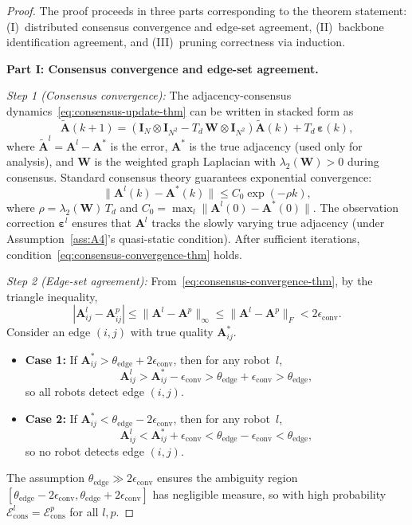 \documentclass[conference]{IEEEconf}
\theoremstyle{plain}
\begin{document}
\begin{proof}
The proof proceeds in three parts corresponding to the theorem statement: (I)~distributed consensus convergence and edge-set agreement, (II)~backbone identification agreement, and (III)~pruning correctness via induction.

\medskip
\noindent\textbf{Part I: Consensus convergence and edge-set agreement.}

\emph{Step 1 (Consensus convergence):}
The adjacency-consensus dynamics~\eqref{eq:consensus-update-thm} can be written in stacked form as
\[
\tilde{\mathbf{A}}(k+1) = (\mathbf{I}_N\otimes\mathbf{I}_{N^2} - T_d\,\mathbf{W}\otimes\mathbf{I}_{N^2})\tilde{\mathbf{A}}(k) + T_d\,\boldsymbol{\varepsilon}(k),
\]
where $\tilde{\mathbf{A}}^l=\mathbf{A}^l-\mathbf{A}^*$ is the error, $\mathbf{A}^*$ is the true adjacency (used only for analysis), and $\mathbf{W}$ is the weighted graph Laplacian with $\lambda_2(\mathbf{W})>0$ during consensus.
Standard consensus theory \cite{olfati2007} guarantees exponential convergence:
\[
\|\mathbf{A}^l(k)-\mathbf{A}^*(k)\| \le C_0\exp(-\rho k),
\]
where $\rho=\lambda_2(\mathbf{W})\,T_d$ and $C_0=\max_l\|\mathbf{A}^l(0)-\mathbf{A}^*(0)\|$.
The observation correction $\boldsymbol{\varepsilon}^l$ ensures that $\mathbf{A}^l$ tracks the slowly varying true adjacency (under Assumption~\ref{ass:A4}'s quasi-static condition).
After sufficient iterations, condition~\eqref{eq:consensus-convergence-thm} holds.

\emph{Step 2 (Edge-set agreement):}
From~\eqref{eq:consensus-convergence-thm}, by the triangle inequality,
\[
|\mathbf{A}^l_{ij}-\mathbf{A}^p_{ij}| \le \|\mathbf{A}^l-\mathbf{A}^p\|_{\infty} \le \|\mathbf{A}^l-\mathbf{A}^p\|_F < 2\epsilon_{\mathrm{conv}}.
\]
Consider an edge $(i,j)$ with true quality $\mathbf{A}^*_{ij}$.
\begin{itemize}
\item \textbf{Case 1:} If $\mathbf{A}^*_{ij}>\theta_{\mathrm{edge}}+2\epsilon_{\mathrm{conv}}$, then for any robot~$l$,
\[
\mathbf{A}^l_{ij} > \mathbf{A}^*_{ij}-\epsilon_{\mathrm{conv}} > \theta_{\mathrm{edge}}+\epsilon_{\mathrm{conv}} > \theta_{\mathrm{edge}},
\]
so all robots detect edge $(i,j)$.

\item \textbf{Case 2:} If $\mathbf{A}^*_{ij}<\theta_{\mathrm{edge}}-2\epsilon_{\mathrm{conv}}$, then for any robot~$l$,
\[
\mathbf{A}^l_{ij} < \mathbf{A}^*_{ij}+\epsilon_{\mathrm{conv}} < \theta_{\mathrm{edge}}-\epsilon_{\mathrm{conv}} < \theta_{\mathrm{edge}},
\]
so no robot detects edge $(i,j)$.
\end{itemize}
The assumption $\theta_{\mathrm{edge}}\gg 2\epsilon_{\mathrm{conv}}$ ensures the ambiguity region $[\theta_{\mathrm{edge}}-2\epsilon_{\mathrm{conv}},\theta_{\mathrm{edge}}+2\epsilon_{\mathrm{conv}}]$ has negligible measure, so with high probability $\mathcal{E}^l_{\mathrm{cons}}=\mathcal{E}^p_{\mathrm{cons}}$ for all $l,p$.


\end{proof}
\end{document}
